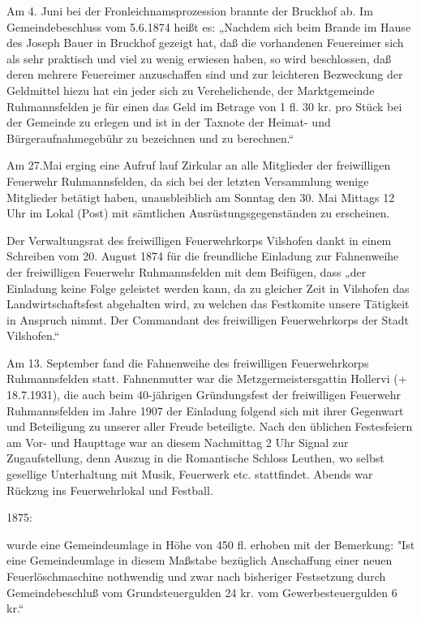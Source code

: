 \documentclass{book}
\begin{document}
Am 4. Juni bei der Fronleichnamsprozession brannte der Bruckhof ab. Im
Gemeindebeschluss vom 5.6.1874 heißt es: „Nachdem sich beim Brande im Hause des
Joseph Bauer in Bruckhof gezeigt hat, daß die vorhandenen Feuereimer sich als
sehr praktisch und viel zu wenig erwiesen haben, so wird beschlossen, daß deren
mehrere Feuereimer anzuschaffen sind und zur leichteren Bezweckung der
Geldmittel hiezu hat ein jeder sich zu Verehelichende, der Marktgemeinde
Ruhmannsfelden je für einen das Geld im Betrage von 1 fl. 30 kr. pro Stück bei
der Gemeinde zu erlegen und ist in der Taxnote der Heimat- und
Bürgeraufnahmegebühr zu bezeichnen und zu berechnen.“

Am 27.Mai erging eine Aufruf lauf Zirkular an alle Mitglieder der freiwilligen
Feuerwehr Ruhmannsfelden, da sich bei der letzten Versammlung wenige Mitglieder
betätigt haben, unausbleiblich am Sonntag den 30. Mai Mittags 12 Uhr im Lokal
(Post) mit sämtlichen Ausrüstungsgegenständen zu erscheinen.

Der Verwaltungsrat des freiwilligen Feuerwehrkorps Vilshofen dankt in einem
Schreiben vom 20. August 1874 für die freundliche Einladung zur Fahnenweihe der
freiwilligen Feuerwehr Ruhmannsfelden mit dem Beifügen, dass „der Einladung
keine Folge geleistet werden kann, da zu gleicher Zeit in Vilshofen das
Landwirtschaftsfest abgehalten wird, zu welchen das Festkomite unsere Tätigkeit
in Anspruch nimmt. Der Commandant des freiwilligen Feuerwehrkorps der Stadt
Vilshofen.“

Am 13. September fand die Fahnenweihe des freiwilligen Feuerwehrkorps
Ruhmannsfelden statt. Fahnenmutter war die Metzgermeistersgattin Hollervi (+
18.7.1931), die auch beim 40-jährigen Gründungsfest der freiwilligen Feuerwehr
Ruhmannsfelden im Jahre 1907 der Einladung folgend sich mit ihrer Gegenwart und
Beteiligung zu unserer aller Freude beteiligte. Nach den üblichen Festesfeiern
am Vor- und Haupttage war an diesem Nachmittag 2 Uhr Signal zur Zugaufstellung,
denn Auszug in die Romantische Schloss Leuthen, wo selbst gesellige Unterhaltung
mit Musik, Feuerwerk etc. stattfindet. Abends war Rückzug ins Feuerwehrlokal und
Festball.

1875:

wurde eine Gemeindeumlage in Höhe von 450 fl. erhoben mit der Bemerkung: "Ist
eine Gemeindeumlage in diesem Maßstabe bezüglich Anschaffung einer neuen
Feuerlöschmaschine nothwendig und zwar nach bisheriger Festsetzung durch
Gemeindebeschluß vom Grundsteuergulden 24 kr. vom Gewerbesteuergulden 6 kr.“
\end{document}
